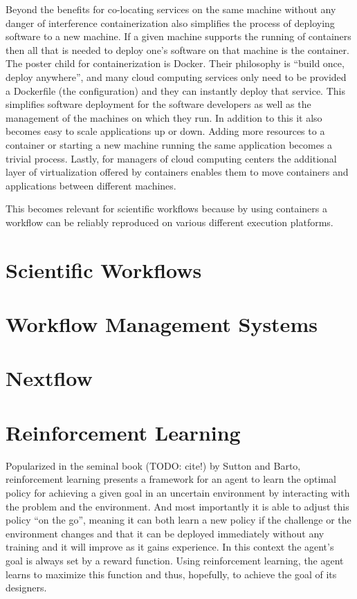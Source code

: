 Beyond the benefits for co-locating services on the same machine without any danger of interference containerization also simplifies the process of deploying software to a new machine. If a given machine supports the running of containers then all that is needed to deploy one's software on that machine is the container. The poster child for containerization is Docker. Their philosophy is ``build once, deploy anywhere'', and many cloud computing services only need to be provided a Dockerfile (the configuration) and they can instantly deploy that service. This simplifies software deployment for the software developers as well as the management of the machines on which they run. In addition to this it also becomes easy to scale applications up or down. Adding more resources to a container or starting a new machine running the same application becomes a trivial process. Lastly, for managers of cloud computing centers the additional layer of virtualization offered by containers enables them to move containers and applications between different machines. 

This becomes relevant for scientific workflows because by using containers a workflow can be reliably reproduced on various different execution platforms. 

\section{Scientific Workflows}
\label{sec:workflows}

\section{Workflow Management Systems}
\label{sec:management}

\section{Nextflow}
\label{sec:nextflow}

\section{Reinforcement Learning}
\label{sec:rl}

Popularized in the seminal book (TODO: cite!) by Sutton and Barto, reinforcement learning presents a framework for an agent to learn the optimal policy for achieving a given goal in an uncertain environment by interacting with the problem and the environment. And most importantly it is able to adjust this policy ``on the go'', meaning it can both learn a new policy if the challenge or the environment changes and that it can be deployed immediately without any training and it will improve as it gains experience. In this context the agent's goal is always set by a reward function. Using reinforcement learning, the agent learns to maximize this function and thus, hopefully, to achieve the goal of its designers. 

